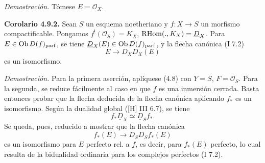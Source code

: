 \emph{Demostración.} Tómese \(E=\mathcal O_X\).

\textbf{Corolario 4.9.2.} Sean \(S\) un esquema noetheriano y \(f:X\to S\) un morfismo compactificable. Pongamos \(f^!(\mathcal O_S)=K_X\), \(\mathrm R\!\operatorname{Hom}(.,K_X)=\underline D_X\). Para \(E\in\operatorname{Ob} D(f)_{\mathrm{parf}}\), se tiene \(\underline D_X(E)\in\operatorname{Ob} D(f)_{\mathrm{parf}}\), y la flecha canónica (I 7.2)
\[
 E\longrightarrow D_XD_X(E)
\]
es un isomorfismo.

\emph{Demostración.} Para la primera aserción, aplíquese (4.8) con \(Y=S\), \(F=\mathcal O_S\). Para la segunda, se reduce fácilmente al caso en que \(f\) es una inmersión cerrada. Basta entonces probar que la flecha deducida de la flecha canónica aplicando \(f_*\) es un isomorfismo. Según la dualidad global ([H] III 6.7), se tiene
\[
 f_*\underline D_X\simeq\underline D_Sf_*.
\]
Se queda, pues, reducido a mostrar que la flecha canónica
\[
 f_*(E)\longrightarrow D_SD_Sf_*(E)
\]
es un isomorfismo para \(E\) perfecto rel. a \(f\), es decir, para \(f_*(E)\) perfecto, lo cual resulta de la bidualidad ordinaria para los complejos perfectos (I 7.2).

